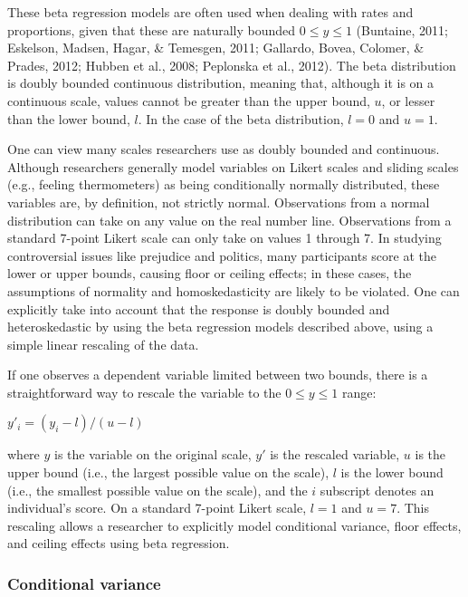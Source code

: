 \documentclass[english,man]{apa6}
\theoremstyle{definition}
\theoremstyle{definition}
\theoremstyle{remark}
\begin{document}
These beta regression models are often used when dealing with rates and
proportions, given that these are naturally bounded \(0 \leq y \leq 1\)
(Buntaine, 2011; Eskelson, Madsen, Hagar, \& Temesgen, 2011; Gallardo,
Bovea, Colomer, \& Prades, 2012; Hubben et al., 2008; Peplonska et al.,
2012). The beta distribution is doubly bounded continuous distribution,
meaning that, although it is on a continuous scale, values cannot be
greater than the upper bound, \(u\), or lesser than the lower bound,
\(l\). In the case of the beta distribution, \(l = 0\) and \(u = 1\).

One can view many scales researchers use as doubly bounded and
continuous. Although researchers generally model variables on Likert
scales and sliding scales (e.g., feeling thermometers) as being
conditionally normally distributed, these variables are, by definition,
not strictly normal. Observations from a normal distribution can take on
any value on the real number line. Observations from a standard 7-point
Likert scale can only take on values 1 through 7. In studying
controversial issues like prejudice and politics, many participants
score at the lower or upper bounds, causing floor or ceiling effects; in
these cases, the assumptions of normality and homoskedasticity are
likely to be violated. One can explicitly take into account that the
response is doubly bounded and heteroskedastic by using the beta
regression models described above, using a simple linear rescaling of
the data.

If one observes a dependent variable limited between two bounds, there
is a straightforward way to rescale the variable to the
\(0 \leq y \leq 1\) range:

\begin{center}
$y'_i = (y_i - l) / (u - l)$
\end{center}

where \(y\) is the variable on the original scale, \(y'\) is the
rescaled variable, \(u\) is the upper bound (i.e., the largest possible
value on the scale), \(l\) is the lower bound (i.e., the smallest
possible value on the scale), and the \(i\) subscript denotes an
individual's score. On a standard 7-point Likert scale, \(l = 1\) and
\(u = 7\). This rescaling allows a researcher to explicitly model
conditional variance, floor effects, and ceiling effects using beta
regression.

\subsubsection{Conditional variance}\label{conditional-variance}
\end{document}
